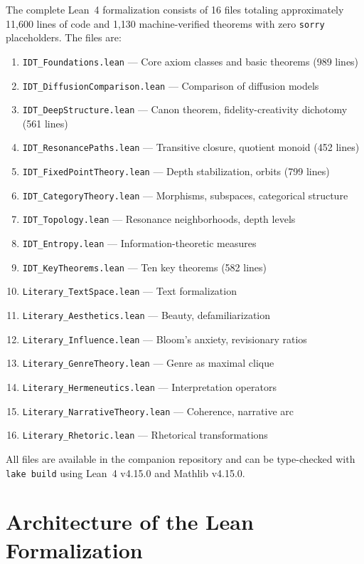 \documentclass[11pt,openany]{book}
\theoremstyle{definition}
\theoremstyle{plain}
\theoremstyle{remark}
\begin{document}
The complete Lean~4 formalization consists of 16 files totaling approximately 11,600 lines of code and 1,130 machine-verified theorems with zero \texttt{sorry} placeholders. The files are:

\begin{enumerate}
\item \texttt{IDT\_Foundations.lean} --- Core axiom classes and basic theorems (989 lines)
\item \texttt{IDT\_DiffusionComparison.lean} --- Comparison of diffusion models
\item \texttt{IDT\_DeepStructure.lean} --- Canon theorem, fidelity-creativity dichotomy (561 lines)
\item \texttt{IDT\_ResonancePaths.lean} --- Transitive closure, quotient monoid (452 lines)
\item \texttt{IDT\_FixedPointTheory.lean} --- Depth stabilization, orbits (799 lines)
\item \texttt{IDT\_CategoryTheory.lean} --- Morphisms, subspaces, categorical structure
\item \texttt{IDT\_Topology.lean} --- Resonance neighborhoods, depth levels
\item \texttt{IDT\_Entropy.lean} --- Information-theoretic measures
\item \texttt{IDT\_KeyTheorems.lean} --- Ten key theorems (582 lines)
\item \texttt{Literary\_TextSpace.lean} --- Text formalization
\item \texttt{Literary\_Aesthetics.lean} --- Beauty, defamiliarization
\item \texttt{Literary\_Influence.lean} --- Bloom's anxiety, revisionary ratios
\item \texttt{Literary\_GenreTheory.lean} --- Genre as maximal clique
\item \texttt{Literary\_Hermeneutics.lean} --- Interpretation operators
\item \texttt{Literary\_NarrativeTheory.lean} --- Coherence, narrative arc
\item \texttt{Literary\_Rhetoric.lean} --- Rhetorical transformations
\end{enumerate}

All files are available in the companion repository and can be type-checked with \texttt{lake build} using Lean~4 v4.15.0 and Mathlib v4.15.0.

\section{Architecture of the Lean Formalization}
\end{document}
